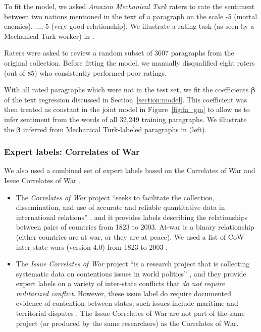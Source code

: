 To fit the model, we asked \emph{Amazon Mechanical Turk} raters to
rate the sentiment between two nations mentioned in the text of a
paragraph on the scale -5 (mortal enemies), $\ldots$, 5 (very good
relationship). We illustrate a rating task (as seen by a Mechanical
Turk worker) in .

Raters were asked to review a random subset of 3607 paragraphs from
the original collection.  Before fitting the model, we manually
disqualified eight raters (out of 85) who consistently performed
poor ratings.

With all rated paragraphs which were not in the test set, we fit the
coefficients $\bm \beta$ of the text regression discussed in
Section~\ref{section:model}.  This coefficient was then treated as
constant in the joint model in Figure~\ref{fig:fa_gm} to allow us to
infer sentiment from the words of all 32,249 training paragraphs.  We
illustrate the $\bm \beta$ inferred from Mechanical Turk-labeled
paragraphs in  (left).

\subsubsection{Expert labels: Correlates of War}
\label{section:correlates_of_war}

We also used a combined set of expert labels based on the Correlates of War \cite{sarkees:2010} and Issue Correlates of War \cite{hensel:2001}.
\begin{itemize}
  \item The \emph{Correlates of War} project ``seeks to facilitate the
    collection, dissemination, and use of accurate and reliable
    quantitative data in international relations''
    \cite{cow_webpage:2012}, and it provides labels describing the
    relationships between pairs of countries from 1823 to 2003.
    At-war is a binary relationship (either countries are at war, or
    they are at peace). We used a list of CoW inter-state wars
    (version 4.0) from 1823 to 2003
    \cite{sarkees:2010}.
  \item The \emph{Issue Correlates of War} project ``is a research
    project that is collecting systematic data on contentious issues
    in world politics'' \cite{icow_webpage:2012}, and they provide
    expert labels on a variety of inter-state conflicts that \emph{do
      not require militarized conflict}.  However, these issue label
    do require documented evidence of contention between states; such
    issues include maritime and territorial disputes
    \cite{icow_webpage:2012,hensel:2001}. The Issue Correlates of War
    are not part of the same project (or produced by the same
    researchers) as the Correlates of War.
\end{itemize}

